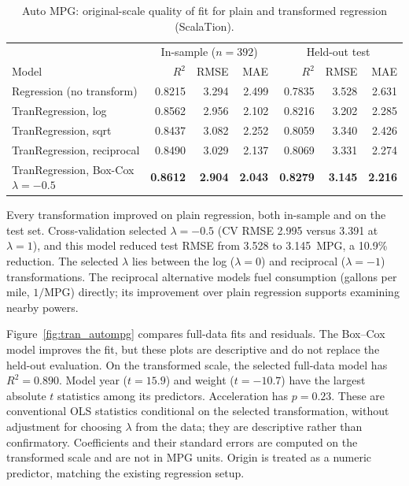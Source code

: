 \documentclass{article}
\begin{document}
\begin{table}[H]
\centering
\small
\begin{tabular}{lrrr|rrr}
\toprule
 & \multicolumn{3}{c|}{In-sample ($n=392$)} & \multicolumn{3}{c}{Held-out test} \\
Model & $R^2$ & RMSE & MAE & $R^2$ & RMSE & MAE \\
\midrule
Regression (no transform)      & 0.8215 & 3.294 & 2.499 & 0.7835 & 3.528 & 2.631 \\
TranRegression, log            & 0.8562 & 2.956 & 2.102 & 0.8216 & 3.202 & 2.285 \\
TranRegression, sqrt           & 0.8437 & 3.082 & 2.252 & 0.8059 & 3.340 & 2.426 \\
TranRegression, reciprocal     & 0.8490 & 3.029 & 2.137 & 0.8069 & 3.331 & 2.274 \\
TranRegression, Box-Cox $\lambda=-0.5$ & \textbf{0.8612} & \textbf{2.904} & \textbf{2.043} & \textbf{0.8279} & \textbf{3.145} & \textbf{2.216} \\
\bottomrule
\end{tabular}
\caption{Auto MPG: original-scale quality of fit for plain and transformed regression (ScalaTion).}
\label{tab:tran_autompg}
\end{table}

Every transformation improved on plain regression, both in-sample and on the test set. Cross-validation selected $\lambda = -0.5$ (CV RMSE 2.995 versus 3.391 at $\lambda = 1$), and this model reduced test RMSE from 3.528 to 3.145~MPG, a 10.9\% reduction. The selected $\lambda$ lies between the log ($\lambda = 0$) and reciprocal ($\lambda = -1$) transformations. The reciprocal alternative models fuel consumption (gallons per mile, $1/\text{MPG}$) directly; its improvement over plain regression supports examining nearby powers.

Figure~\ref{fig:tran_autompg} compares full-data fits and residuals. The Box--Cox model improves the fit, but these plots are descriptive and do not replace the held-out evaluation. On the transformed scale, the selected full-data model has $R^2=0.890$. Model year ($t=15.9$) and weight ($t=-10.7$) have the largest absolute $t$ statistics among its predictors. Acceleration has $p=0.23$. These are conventional OLS statistics conditional on the selected transformation, without adjustment for choosing $\lambda$ from the data; they are descriptive rather than confirmatory. Coefficients and their standard errors are computed on the transformed scale and are not in MPG units. Origin is treated as a numeric predictor, matching the existing regression setup.
\end{document}
